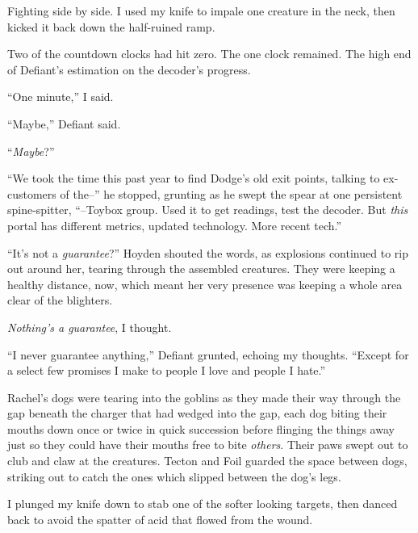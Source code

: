 Fighting side by side.  I used my knife to impale one creature in the neck, then kicked it back down the half-ruined ramp.



Two of the countdown clocks had hit zero.  The one clock remained.  The high end of Defiant's estimation on the decoder's progress.



``One minute,'' I said.



``Maybe,'' Defiant said.



``\emph{Maybe}?''



``We took the time this past year to find Dodge's old exit points, talking to ex-customers of the--'' he stopped, grunting as he swept the spear at one persistent spine-spitter, ``--Toybox group.  Used it to get readings, test the decoder.  But \emph{this} portal has different metrics, updated technology.  More recent tech.''



``It's not a \emph{guarantee}?''  Hoyden shouted the words, as explosions continued to rip out around her, tearing through the assembled creatures.  They were keeping a healthy distance, now, which meant her very presence was keeping a whole area clear of the blighters.



\emph{Nothing's a guarantee}, I thought.



``I never guarantee anything,'' Defiant grunted, echoing my thoughts.  ``Except for a select few promises I make to people I love and people I hate.''



Rachel's dogs were tearing into the goblins as they made their way through the gap beneath the charger that had wedged into the gap, each dog biting their mouths down once or twice in quick succession before flinging the things away just so they could have their mouths free to bite \emph{others}.  Their paws swept out to club and claw at the creatures.  Tecton and Foil guarded the space between dogs, striking out to catch the ones which slipped between the dog's legs.



I plunged my knife down to stab one of the softer looking targets, then danced back to avoid the spatter of acid that flowed from the wound.



